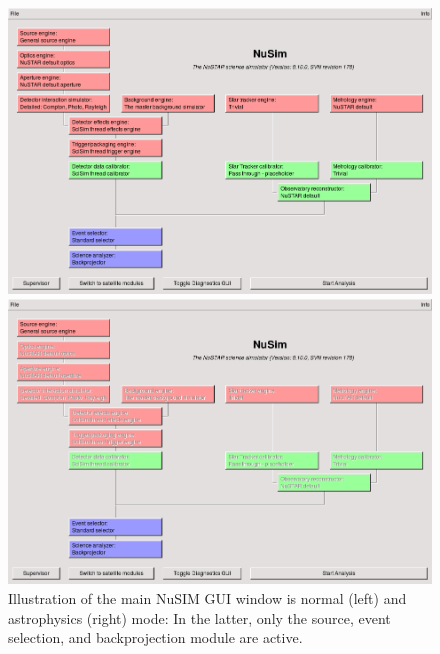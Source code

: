 \documentclass[11pt]{article}
\begin{document}
\begin{figure}[bt]
  \begin{minipage}[c]{0.48\linewidth}
    \begin{center}
      \includegraphics[scale=0.27]{images/MainWindowNormalMode.png}  
    \end{center}
  \end{minipage}
  \hspace{0.04\linewidth}
  \begin{minipage}[c]{0.48\linewidth}
    \begin{center}
      \includegraphics[scale=0.27]{images/MainWindowAstrophysicsMode.png}  
    \end{center}
  \end{minipage}
  \caption{\label{fig:mainwindowmodes} Illustration of the main NuSIM GUI window is normal (left) and astrophysics (right) mode: In the latter, only the source, event selection, and backprojection module are active. }
\end{figure}
\end{document}
